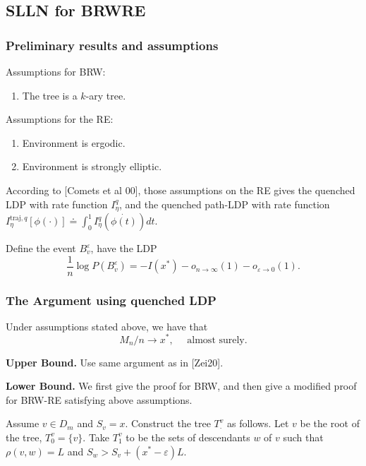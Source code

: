 \newpage
\subsection{SLLN for BRWRE}

\subsubsection{Preliminary results and assumptions}

Assumptions for BRW:
\begin{enumerate}
	\item The tree is a $k$-ary tree.
\end{enumerate}
Assumptions for the RE:
\begin{enumerate}
	\item Environment is ergodic.
	\item Environment is strongly elliptic.
\end{enumerate}

According to [Comets et al 00], those assumptions on the RE gives the quenched LDP with rate function $I^q_\eta$, and the quenched path-LDP with rate function $I_\eta^{\text{traj}, q}[\phi(\cdot )] \doteq \int _0^1 I_\eta^q \left( \dot{\phi(t)}\right) d t$.


Define the event $B^\varepsilon_v$, have the LDP
\[
	\frac{1}{n} \log P(B^\varepsilon_v) = - I(x^*) - o_{n \to \infty }(1) - o_{\varepsilon \to 0}(1)
.\] 


\subsubsection{The Argument using quenched LDP}



\begin{proposition}
	\label{prop:SLLN-BRWRE}
	Under assumptions stated above, we have that
	\[
		M_n / n \to x^*, \quad \text{ almost surely}
	.\] 
\end{proposition}
\textbf{Upper Bound.} Use same argument as in [Zei20]. 

\textbf{Lower Bound.} We first give the proof for BRW, and then give a modified proof for BRW-RE satisfying above assumptions.

Assume $v \in D_m$ and $S_v = x$. Construct the tree $T^v_\cdot $ as follows. Let $v$ be the root of the tree, $T^v_0 = \{v\} $. Take $T^v_1$ to be the sets of descendants $w$ of $v$ such that $\rho(v, w) = L$ and $S_w > S_v + (x^* - \varepsilon)L$.

